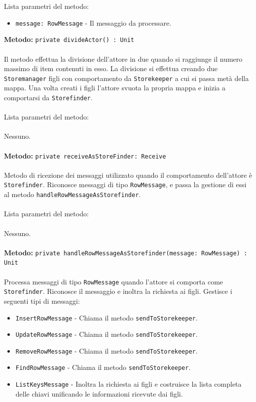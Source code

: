 \documentclass[a4paper]{article}
\begin{document}
			Lista parametri del metodo:
			\begin{itemize}
				\item \texttt{message: RowMessage} - Il messaggio da processare.
			\end{itemize}
		\textbf{Metodo: }\texttt{private divideActor() : Unit}
			\\ \\
				Il metodo effettua la divisione dell'attore in due quando si raggiunge il numero massimo di item contenuti in esso. La divisione si effettua creando due \texttt{Storemanager} figli con comportamento da \texttt{Storekeeper} a cui si passa metà della mappa. Una volta creati i figli l'attore svuota la propria mappa e inizia a comportarsi da \texttt{Storefinder}.
			\\ \\
			Lista parametri del metodo:
			\\ \\
				Nessuno. 
			\\ \\
		\textbf{Metodo: }\texttt{private receiveAsStoreFinder: Receive}
			\\ \\
			Metodo di ricezione dei messaggi utilizzato quando il comportamento dell'attore è \texttt{Storefinder}. Riconosce messaggi di tipo \texttt{RowMessage}, e passa la gestione di essi al metodo \texttt{handleRowMessageAsStorefinder}.
			\\ \\
			Lista parametri del metodo:
			\\ \\
			Nessuno.
			\\ \\
		\textbf{Metodo: }\texttt{private handleRowMessageAsStorefinder(message: RowMessage) : Unit}
			\\ \\
			Processa messaggi di tipo \texttt{RowMessage} quando l'attore si comporta come \texttt{Storefinder}. Riconosce il messaggio e inoltra la richiesta ai figli.
			Gestisce i seguenti tipi di messaggi:
			\begin{itemize}
				\item \texttt{InsertRowMessage} - Chiama il metodo \texttt{sendToStorekeeper}.
				\item \texttt{UpdateRowMessage} - Chiama il metodo \texttt{sendToStorekeeper}.
				\item \texttt{RemoveRowMessage} - Chiama il metodo \texttt{sendToStorekeeper}.
				\item \texttt{FindRowMessage} - Chiama il metodo \texttt{sendToStorekeeper}.
				\item \texttt{ListKeysMessage} - Inoltra la richiesta ai figli e costruisce la lista completa delle chiavi unificando le informazioni ricevute dai figli.
			\end{itemize}
\end{document}
